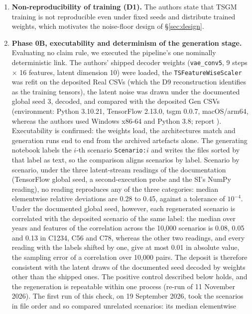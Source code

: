 \documentclass[11pt,a4paper]{article}
\newcommand{\prop}[1]{#1}
\newcommand{\prop}[1]{\textcolor{blue}{#1}}
\begin{document}
\begin{enumerate}[nosep]
  v1.0.1 ten months after publication, without changelog.
\item \textbf{Non-reproducibility of training (D1).} The authors state that
  TSGM training is not reproducible even under fixed seeds and distribute
  trained weights, which motivates the noise-floor design of
  \S\ref{sec:design}.
\item \textbf{Phase 0B, executability and determinism of the generation
  stage.} Evaluating no claim rule, we executed the pipeline's one
  nominally deterministic link. The authors' shipped decoder weights
  (\texttt{vae\_conv5}, 9 steps $\times$ 16 features, latent dimension 10)
  were loaded, the \texttt{TSFeatureWiseScaler} was refit on the deposited
  Real CSVs (which the D9 reconstruction identifies as the training
  tensors), the latent noise was drawn under the documented global seed 3,
  decoded, and compared with the deposited Gen CSVs (environment: Python
  3.10.21, TensorFlow 2.13.0, tsgm 0.0.7, macOS/arm64, whereas the authors
  used Windows x86-64 and Python 3.8; report
  ). Executability is confirmed: the weights
  load, the architectures match and generation runs end to end from the
  archived artefacts alone. \prop{The generating notebook labels the $i$-th
  scenario \texttt{Scenario:}$i$ and writes the files sorted by that label as
  text, so the comparison aligns scenarios by label. Scenario by scenario,
  under the three latent-stream readings of the documentation (TensorFlow
  global seed, a second-execution probe and the SI's NumPy reading), no
  reading reproduces any of the three categories: median elementwise
  relative deviations are 0.28 to 0.45, against a tolerance of $10^{-4}$.
  Under the documented global seed, however, each regenerated scenario is
  correlated with the deposited scenario of the same label: the median over
  years and features of the correlation across the 10{,}000 scenarios is
  0.08, 0.05 and 0.13 in C1234, C56 and C78, whereas the other two readings,
  and every reading with the labels shifted by one, give at most 0.01 in
  absolute value, the sampling error of a correlation over 10{,}000 pairs.
  The deposit is therefore consistent with the latent draws of the
  documented seed decoded by weights other than the shipped ones. The
  positive control described below holds, and the regeneration is
  repeatable within one process (re-run of 11 November 2026).}
  \prop{The first run of this check, on 19 September 2026, took the scenarios
  in file order and so compared unrelated scenarios: its median elementwise
}
\end{enumerate}
\end{document}
